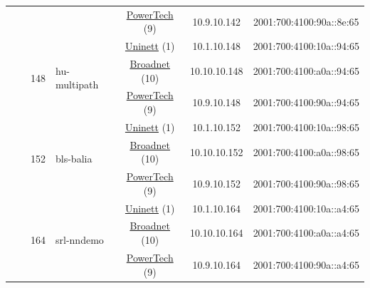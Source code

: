 \begin{small}
\begin{center}
\begin{longtable}{|c|c|c|c|c|c|c|c|}
  &  &  &  & \multicolumn{2}{|c|}{\tiny{\href{http://www.powertech.no}{PowerTech} (9)}} & \tiny{10.9.10.142} & \tiny{2001:700:4100:90a::8e:65} \\* \cline{3-3}\cline{4-4}\cline{5-5}\cline{6-6}\cline{7-7}\cline{8-8}
  &  & \multirow{3}{*}{\tiny{148}} & \multicolumn{1}{|l|}{\multirow{3}{*}{\tiny{hu-multipath}}} & \multicolumn{2}{|c|}{\tiny{\href{https://www.uninett.no}{Uninett} (1)}} & \tiny{10.1.10.148} & \tiny{2001:700:4100:10a::94:65} \\* \cline{5-5}\cline{6-6}\cline{7-7}\cline{8-8}
  &  &  &  & \multicolumn{2}{|c|}{\tiny{\href{https://www.broadnet.no}{Broadnet} (10)}} & \tiny{10.10.10.148} & \tiny{2001:700:4100:a0a::94:65} \\* \cline{5-5}\cline{6-6}\cline{7-7}\cline{8-8}
  &  &  &  & \multicolumn{2}{|c|}{\tiny{\href{http://www.powertech.no}{PowerTech} (9)}} & \tiny{10.9.10.148} & \tiny{2001:700:4100:90a::94:65} \\* \cline{3-3}\cline{4-4}\cline{5-5}\cline{6-6}\cline{7-7}\cline{8-8}
  &  & \multirow{3}{*}{\tiny{152}} & \multicolumn{1}{|l|}{\multirow{3}{*}{\tiny{bls-balia}}} & \multicolumn{2}{|c|}{\tiny{\href{https://www.uninett.no}{Uninett} (1)}} & \tiny{10.1.10.152} & \tiny{2001:700:4100:10a::98:65} \\* \cline{5-5}\cline{6-6}\cline{7-7}\cline{8-8}
  &  &  &  & \multicolumn{2}{|c|}{\tiny{\href{https://www.broadnet.no}{Broadnet} (10)}} & \tiny{10.10.10.152} & \tiny{2001:700:4100:a0a::98:65} \\* \cline{5-5}\cline{6-6}\cline{7-7}\cline{8-8}
  &  &  &  & \multicolumn{2}{|c|}{\tiny{\href{http://www.powertech.no}{PowerTech} (9)}} & \tiny{10.9.10.152} & \tiny{2001:700:4100:90a::98:65} \\* \cline{3-3}\cline{4-4}\cline{5-5}\cline{6-6}\cline{7-7}\cline{8-8}
  &  & \multirow{3}{*}{\tiny{164}} & \multicolumn{1}{|l|}{\multirow{3}{*}{\tiny{srl-nndemo}}} & \multicolumn{2}{|c|}{\tiny{\href{https://www.uninett.no}{Uninett} (1)}} & \tiny{10.1.10.164} & \tiny{2001:700:4100:10a::a4:65} \\* \cline{5-5}\cline{6-6}\cline{7-7}\cline{8-8}
  &  &  &  & \multicolumn{2}{|c|}{\tiny{\href{https://www.broadnet.no}{Broadnet} (10)}} & \tiny{10.10.10.164} & \tiny{2001:700:4100:a0a::a4:65} \\* \cline{5-5}\cline{6-6}\cline{7-7}\cline{8-8}
  &  &  &  & \multicolumn{2}{|c|}{\tiny{\href{http://www.powertech.no}{PowerTech} (9)}} & \tiny{10.9.10.164} & \tiny{2001:700:4100:90a::a4:65} \\* \cline{3-3}\cline{4-4}\cline{5-5}\cline{6-6}\cline{7-7}\cline{8-8}

\end{longtable}
\end{center}
\end{small}
